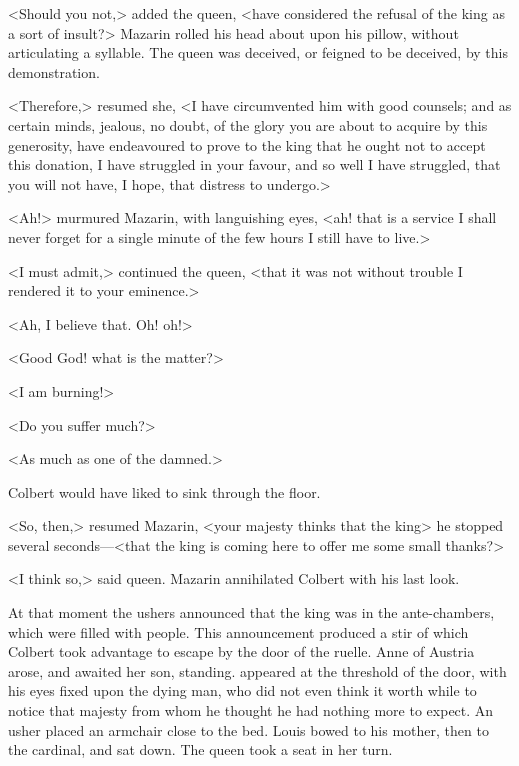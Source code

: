 <Should you not,> added the queen, <have considered the refusal of the king as a sort of insult?> Mazarin rolled his head about upon his pillow, without articulating a syllable. The queen was deceived, or feigned to be deceived, by this demonstration.

<Therefore,> resumed she, <I have circumvented him with good counsels; and as certain minds, jealous, no doubt, of the glory you are about to acquire by this generosity, have endeavoured to prove to the king that he ought not to accept this donation, I have struggled in your favour, and so well I have struggled, that you will not have, I hope, that distress to undergo.>

<Ah!> murmured Mazarin, with languishing eyes, <ah! that is a service I shall never forget for a single minute of the few hours I still have to live.>

<I must admit,> continued the queen, <that it was not without trouble I rendered it to your eminence.>

<Ah,  I believe that. Oh! oh!>

<Good God! what is the matter?>

<I am burning!>

<Do you suffer much?>

<As much as one of the damned.>

Colbert would have liked to sink through the floor.

<So, then,> resumed Mazarin, <your majesty thinks that the king\longdash> he stopped several seconds—<that the king is coming here to offer me some small thanks?>

<I think so,> said queen. Mazarin annihilated Colbert with his last look.

At that moment the ushers announced that the king was in the ante-chambers, which were filled with people. This announcement produced a stir of which Colbert took advantage to escape by the door of the ruelle. Anne of Austria arose, and awaited her son, standing.  appeared at the threshold of the door, with his eyes fixed upon the dying man, who did not even think it worth while to notice that majesty from whom he thought he had nothing more to expect. An usher placed an armchair close to the bed. Louis bowed to his mother, then to the cardinal, and sat down. The queen took a seat in her turn.

